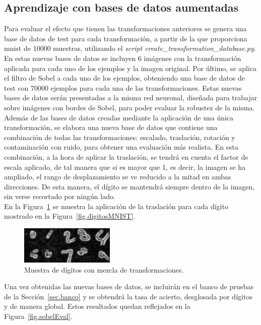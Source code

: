 \subsection{Aprendizaje con bases de datos aumentadas} \label{sec.transformaciones}
Para evaluar el efecto que tienen las transformaciones anteriores se genera una base de datos de test para cada transformación, a partir de la que proporciona \acrshort{mnist} de 10000 muestras, utilizando el \textit{script create\_transformation\_database.py}. En estas nuevas bases de datos se incluyen 6 imágenes con la transformación aplicada para cada uno de los ejemplos y la imagen original. Por último, se aplica el filtro de Sobel a cada uno de los ejemplos, obteniendo una base de datos de test con 70000 ejemplos para cada una de las transformaciones. Estas nuevas bases de datos serán presentadas a la misma red neuronal, diseñada para trabajar sobre imágenes con bordes de Sobel, para poder evaluar la robustez de la misma.\\

Además de las bases de datos creadas mediante la aplicación de una única transformación, se elabora una nueva base de datos que contiene una combinación de todas las transformaciones: escalado, traslación, rotación y contaminación con ruido, para obtener una evaluación más realista. En esta combinación, a la hora de aplicar la traslación, se tendrá en cuenta el factor de escala aplicado, de tal manera que si es mayor que 1, es decir, la imagen se ha ampliado, el rango de desplazamiento se ve reducido a la mitad en ambas direcciones. De esta manera, el dígito se mantendrá siempre dentro de la imagen, sin verse recortado por ningún lado.\\

En la Figura~\ref{fig.mix} se muestra la aplicación de la traslación para cada dígito mostrado en la Figura~\ref{fig.digitosMNIST}.
\begin{figure}[H]
	\begin{center}
		\includegraphics[width=0.4\textwidth]{figures/mix}
		\caption{Muestra de dígitos con mezcla de transformaciones.}
		\label{fig.mix}
	\end{center}
\end{figure}

Una vez obtenidas las nuevas bases de datos, se incluirán en el banco de pruebas de la Sección~\ref{sec.banco} y se obtendrá la tasa de acierto, desglosada por dígitos y de manera global. Estos resultados quedan reflejados en la Figura~\ref{fig.sobelEval}.

